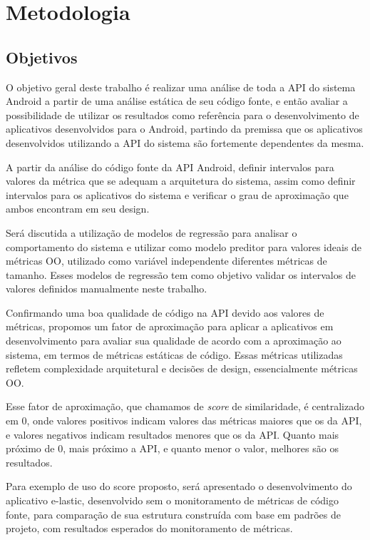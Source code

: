 \chapter{Metodologia}
\label{cap:metodologia}

\section{Objetivos}
O objetivo geral deste trabalho é realizar uma análise de toda a API do sistema Android a partir de uma análise estática de seu código fonte, e então avaliar a possibilidade de utilizar os resultados como referência para o desenvolvimento de aplicativos desenvolvidos para o Android, partindo da premissa que os aplicativos desenvolvidos utilizando a API do sistema são fortemente dependentes da mesma.

A partir da análise do código fonte da API Android, definir intervalos para valores da métrica que se adequam a arquitetura do sistema, assim como definir intervalos para os aplicativos do sistema e verificar o grau de aproximação que ambos encontram em seu design. 

Será discutida a utilização de modelos de regressão para analisar o comportamento do sistema e utilizar como modelo preditor para valores ideais de métricas OO, utilizado como variável independente diferentes métricas de tamanho. Esses modelos de regressão tem como objetivo validar os intervalos de valores definidos manualmente neste trabalho.

Confirmando uma boa qualidade de código na API devido aos valores de métricas, propomos um fator de aproximação para aplicar a aplicativos em desenvolvimento para avaliar sua qualidade de acordo com a aproximação ao sistema, em termos de métricas estáticas de código. Essas métricas utilizadas refletem complexidade arquitetural e decisões de design, essencialmente métricas OO.

Esse fator de aproximação, que chamamos de \textit{score} de similaridade, é centralizado em 0, onde valores positivos indicam valores das métricas maiores que os da API, e valores negativos indicam resultados menores que os da API. Quanto mais próximo de 0, mais próximo a API, e quanto menor o valor, melhores são os resultados. 

Para exemplo de uso do score proposto, será apresentado o desenvolvimento do aplicativo e-lastic, desenvolvido sem o monitoramento de métricas de código fonte, para comparação de sua estrutura construída com base em padrões de projeto, com resultados esperados do monitoramento de métricas.

